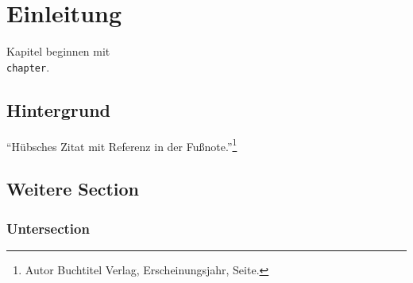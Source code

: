 
\chapter{Einleitung}
\label{chap:einleitung}

Kapitel beginnen mit \texttt{\\chapter}.

\section{Hintergrund} %
\label{sec:hintergrund}

\begin{center}
    ``Hübsches Zitat mit Referenz in der Fußnote.''\footnote{Autor Buchtitel Verlag, Erscheinungsjahr, Seite.}
\end{center}

\section{Weitere Section} %
\label{sec:weitere_arbeiten}

\subsection{Untersection}
\label{ssec:untersection}

\blindtext
